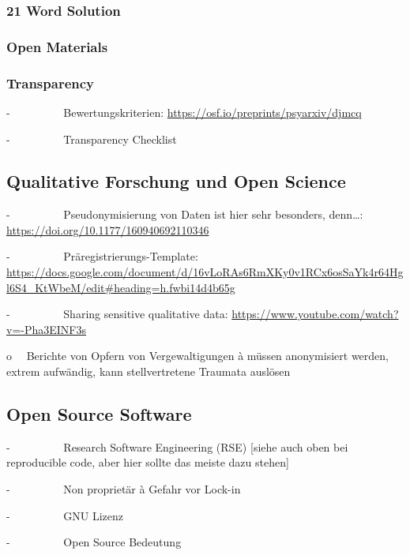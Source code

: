 \documentclass[
  letterpaper,
  DIV=11,
  numbers=noendperiod]{scrreprt}
\begin{document}
\subsubsection{21 Word Solution}\label{word-solution}

\subsubsection{Open Materials}\label{open-materials}

\subsubsection{Transparency}\label{transparency}

-~~~~~~~~~ Bewertungskriterien:
\url{https://osf.io/preprints/psyarxiv/djmcq}

-~~~~~~~~~ Transparency Checklist

\subsection{Qualitative Forschung und Open
Science}\label{qualitative-forschung-und-open-science}

-~~~~~~~~~ Pseudonymisierung von Daten ist hier sehr besonders,
denn\ldots:
\href{https://doi.org/10.1177/16094069211034641}{https://doi.org/10.1177/160940692110346}

-~~~~~~~~~ Präregistrierungs-Template:
\url{https://docs.google.com/document/d/16vLoRAs6RmXKy0v1RCx6osSaYk4r64Hgl6S4_KtWbeM/edit\#heading=h.fwbi14d4b65g}

-~~~~~~~~~ Sharing sensitive qualitative data:
\url{https://www.youtube.com/watch?v=-Pha3EINF3s}

o~~ Berichte von Opfern von Vergewaltigungen à müssen anonymisiert
werden, extrem aufwändig, kann stellvertretene Traumata auslösen

\subsection{Open Source Software}\label{open-source-software}

-~~~~~~~~~ Research Software Engineering (RSE) {[}siehe auch oben bei
reproducible code, aber hier sollte das meiste dazu stehen{]}

-~~~~~~~~~ Non proprietär à Gefahr vor Lock-in

-~~~~~~~~~ GNU Lizenz

-~~~~~~~~~ Open Source Bedeutung
\end{document}

